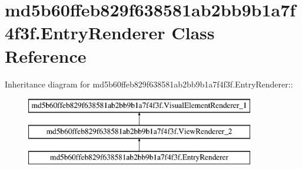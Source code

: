 \hypertarget{classmd5b60ffeb829f638581ab2bb9b1a7f4f3f_1_1_entry_renderer}{
\section{md5b60ffeb829f638581ab2bb9b1a7f4f3f.EntryRenderer Class Reference}
\label{classmd5b60ffeb829f638581ab2bb9b1a7f4f3f_1_1_entry_renderer}
}
Inheritance diagram for md5b60ffeb829f638581ab2bb9b1a7f4f3f.EntryRenderer::\begin{figure}[H]
\begin{center}
\leavevmode
\includegraphics[height=3cm]{classmd5b60ffeb829f638581ab2bb9b1a7f4f3f_1_1_entry_renderer}
\end{center}
\end{figure}
